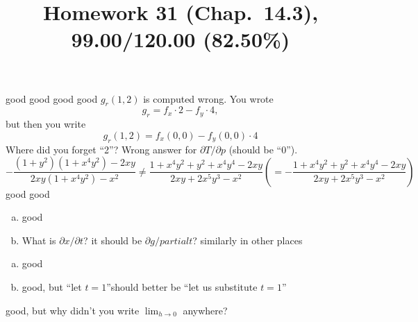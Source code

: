 \documentclass[pstricks,10pt,dvipsnames]{article} %
\title{Homework 31 (Chap.~14.3),
99.00/120.00 (82.50\%)
}
\begin{document}
\maketitle
{}
good
good
good
good
$g_r(1,2)$ is computed wrong. You wrote
\begin{equation*}
	g_r=f_x\cdot2-f_y\cdot4,
\end{equation*}
but then you write
\begin{equation*}
	g_r(1,2)=f_x(0,0)-f_y(0,0)\cdot4
\end{equation*}
Where did you forget ``2''?
Wrong answer for $\partial T/\partial p$ (should be ``0'').
\begin{equation*}
	-\frac{(1+y^2)(1+x^4y^2)-2xy}{2xy(1+x^4y^2)-x^2}\neq\frac{1+x^4y^2+y^2+x^4y^4-2xy}{2xy+2x^5y^3-x^2}
	\left( =-\frac{1+x^4y^2+y^2+x^4y^4-2xy}{2xy+2x^5y^3-x^2} \right)
\end{equation*}
good
good
\begin{enumerate}[(a)]
	\item good
	\item What is $\partial x/\partial t$? it should be $\partial g/partial t$? similarly in other places
\end{enumerate}
\begin{enumerate}[(a)]
	\item good
	\item good, but ``let $t=1$''should better be ``let us substitute $t=1$''
\end{enumerate}
good, but why didn't you write $\lim_{h\to0}$ anywhere?
\end{document}
